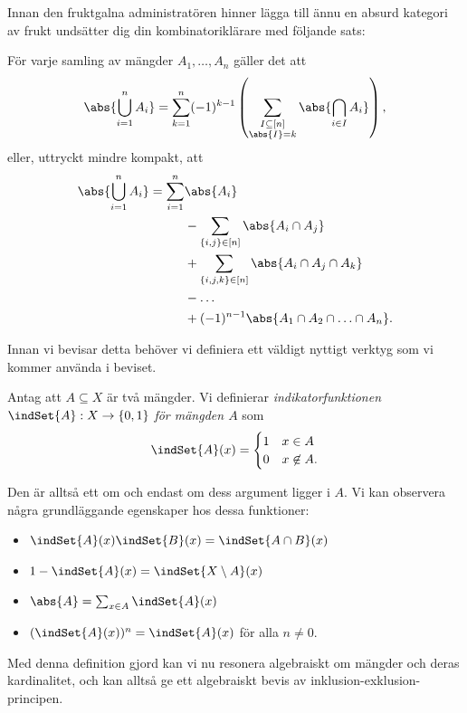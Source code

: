 \documentclass[nobib]{tufte-handout}
\begin{document}
Innan den fruktgalna administratören hinner lägga till ännu en absurd kategori av frukt undsätter dig din kombinatoriklärare med följande sats:
\begin{theorem}\label{theorem_inclusion_exclusion}
  För varje samling av mängder $A_1, \ldots, A_n$ gäller det att
  $$\abs{\bigcup_{i=1}^n A_i} = \sum_{k=1}^{n} (-1)^{k-1}\left(\sum_{\substack{I \subseteq [n]\\\abs{I} = k}} \abs{\bigcap_{i \in I} A_i}\right),$$
  eller, uttryckt mindre kompakt, att
  \begin{align*}
    \abs{\bigcup_{i=1}^n A_i} = \sum_{i=1}^n &\abs{A_i}\\
    & - \sum_{\{i,j\} \in [n]} \abs{A_i \cap A_j}\\
    & + \sum_{ \{i, j, k\} \in [n] } \abs{A_i \cap A_j \cap A_k}\\
    & - \ldots\\
    & + (-1)^{n-1}\abs{A_1\cap A_2\cap\ldots\cap A_n}.
  \end{align*}
\end{theorem}

Innan vi bevisar detta behöver vi definiera ett väldigt nyttigt verktyg som vi kommer använda i beviset.

\begin{definition}
  Antag att $A \subseteq X$ är två mängder. Vi definierar \emph{indikatorfunktionen} $\indSet{A}: X \to \{0,1\}$ \emph{för mängden $A$} som
  $$\indSet{A}(x) = \begin{cases}
    1  & x \in A \\
    0 & x \not\in A.
  \end{cases}$$

  Den är alltså ett om och endast om dess argument ligger i $A$. Vi kan observera några grundläggande egenskaper hos dessa funktioner:
  \begin{itemize}
    \item $\indSet{A}(x)\indSet{B}(x) = \indSet{A\cap B}(x)$
    \item $1 - \indSet{A}(x) = \indSet{X \setminus A}(x)$
    \item $\abs{A} = \sum_{x \in A} \indSet{A}(x)$
    \item $(\indSet{A}(x))^n = \indSet{A}(x)$ för alla $n \neq 0$.
  \end{itemize}
\end{definition}

Med denna definition gjord kan vi nu resonera algebraiskt om mängder och deras kardinalitet, och kan alltså ge ett algebraiskt bevis av inklusion-exklusion-principen.
\end{document}
